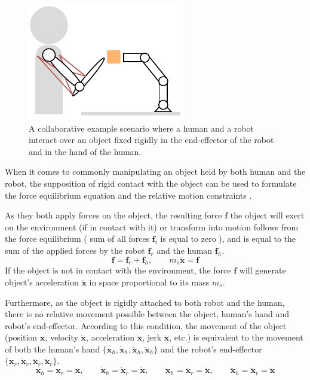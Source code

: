 \begin{figure}
    \centering
    \includegraphics{Chapters/imgs/example_inter.pdf}
    \caption{A collaborative example scenario where a human and a robot interact over an object fixed rigidly in the end-effector of the robot and in the hand of the human.}
    \label{fig:table_inter}
\end{figure}
When it comes to commonly manipulating an object held by both human and the robot, the supposition of rigid contact with the object can be used to formulate the force equilibrium equation and the relative motion constraints \cite{Prattichizzo2016}. 

As they both apply forces on the object, the resulting force $\bm{f}$ the object will exert on the environment (if in contact with it) or transform into motion follows from the force equilibrium ( sum of all forces $\bm{f}_i$ is equal to zero ), and is equal to the sum of the applied forces by the robot $\bm{f}_r$ and the human $\bm{f}_h$. 
\begin{equation}
    \bm{f} = \bm{f}_r + \bm{f}_h, \qquad  m_o\ddot{\bm{x}} = \bm{f} 
\end{equation}
If the object is not in contact with the environment, the force $\bm{f}$ will generate object's acceleration $\ddot{\bm{x}}$  in space proportional to its mass $m_o$.

Furthermore, as the object is rigidly attached to both robot and the human, there is no relative movement possible between the object, human's hand and robot's end-effector. According to this condition, the movement of the object (position $\bm{x}$, velocity $\dot{\bm{x}}$, acceleration $\ddot{\bm{x}}$, jerk $\dddot{\bm{x}}$, etc.) is equivalent to the movement of both the human's hand $\{\bm{x}_h,\dot{\bm{x}}_h,\ddot{\bm{x}}_h,\dddot{\bm{x}}_h\}$ and the robot's end-effector $\{\bm{x}_r,\dot{\bm{x}}_r,\ddot{\bm{x}}_r,\dddot{\bm{x}}_r\}$.
\begin{equation}
    {\bm{x}}_h={\bm{x}}_r={\bm{x}}, \qquad
    \dot{\bm{x}}_h=\dot{\bm{x}}_r=\dot{\bm{x}}, \qquad
    \ddot{\bm{x}}_h=\ddot{\bm{x}}_r=\ddot{\bm{x}}, \qquad
    \dddot{\bm{x}}_h=\dddot{\bm{x}}_r=\dddot{\bm{x}}
    \label{eq:kinematic_condition_contact}
\end{equation}

